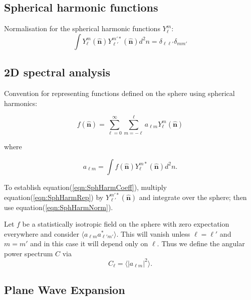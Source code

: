 \documentclass[11pt]{article}
\begin{document}
\subsection{Spherical harmonic functions}

Normalisation for the spherical harmonic functions $Y_{\ell}^m$:
\begin{equation}
\label{eqn:SphHarmNorm}
\int {Y_\ell^m(\boldsymbol{\hat{n}})} {Y_{\ell'}^{m' \ast}(\boldsymbol{\hat{n}})}d^2n = \delta_{\ell \ell'} \delta_{m m'}
\end{equation}



\subsection{2D spectral analysis}

Convention for representing functions defined on the sphere using spherical harmonics:

\begin{equation}
\label{eqn:SphHarmRep}
f(\boldsymbol{\hat{n}}) = \sum_{\ell=0}^\infty \sum_{m=-\ell}^{\ell} a_{\ell m} Y_{\ell}^m(\boldsymbol{\hat{n}})
\end{equation}

\noindent where

\begin{equation}
\label{eqn:SphHarmCoeff}
a_{\ell m} = \int f(\boldsymbol{\hat{n}}) Y_{\ell}^{m \ast}(\boldsymbol{\hat{n}}) d^2n.
\end{equation}

\noindent To establish equation(\ref{eqn:SphHarmCoeff}), multiply equation(\ref{eqn:SphHarmRep}) by $Y_{\ell'}^{m'*}(\boldsymbol{\hat{n}})$ and integrate over the sphere; then use equation(\ref{eqn:SphHarmNorm}).


Let $f$ be a statistically isotropic field on the sphere with zero expectation everywhere and consider $\langle a_{\ell m} a^{\ast}_{\ell' m'} \rangle$. This will vanish unless $\ell = \ell'$ and $m=m'$ and in this case it will depend only on $\ell$. Thus we define the angular power spectrum $C$ via
\begin{equation}
C_{\ell} = \langle | a_{\ell m} | ^2 \rangle.
\end{equation}

\subsection{Plane Wave Expansion}
\end{document}
